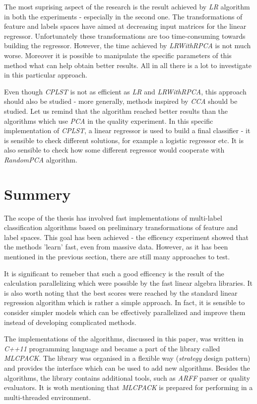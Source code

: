 The most suprising aspect of the research is the result achieved by \textit{LR} algorithm in both the experiments - especially in the second one. The transformations of feature and labels spaces have aimed at decreasing input matrices for the linear regressor. Unfortunately these transformations are too time-consuming towards building the regressor. However, the time achieved by \textit{LRWithRPCA} is not much worse. Moreover it is possible to manipulate the specific parameters of this method what can help obtain better results. All in all there is a lot to investigate in this particular approach.   

Even though \textit{CPLST} is not as efficient as \textit{LR} and \textit{LRWithRPCA}, this approach should also be studied - more generally, methods inspired by \textit{CCA} should be studied. Let us remind that the algorithm reached better results than the algorithms which use \textit{PCA} in the quality experiment. In this specific implementation of \textit{CPLST}, a linear regressor is used to build a final classifier - it is sensible to check different solutions, for example a logistic regressor etc. It is also sensible to check how some different regressor would cooperate with \textit{RandomPCA} algorithm.

\section{Summery}

The scope of the thesis has involved fast implementations of multi-label classification algorithms based on preliminary transformations of feature and label spaces. This goal has been achieved - the efficency experiment showed that the methods 'learn' fast, even from massive data. However, as it has been mentioned in the previous section, there are still many approaches to test.  

It is significant to remeber that such a good efficency is the result of the calculation parallelizing which were possible by the fast linear algebra libraries. It is also worth noting that the best scores were reached by the standard linear regression algorithm which is rather a simple approach. In fact, it is sensible to consider simpler models which can be effectively parallelized and improve them instead of developing complicated methods. 

The implementations of the algorithms, discussed in this paper, was written in \textit{C++11} programming language and became a part of the library called \textit{MLCPACK}. The library was organised in a flexible way (\textit{strategy} design pattern) and provides the interface which can be used to add new algorithms. Besides the algorithms, the library contains additional tools, such as \textit{ARFF} parser or quality evaluators. It is woth mentioning that \textit{MLCPACK} is prepared for performing in a multi-threaded environment.
